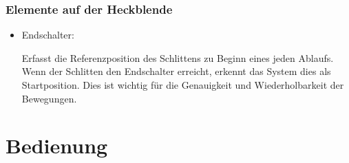 \documentclass[a4paper,12pt]{report}
\begin{document}
	\subsection{Elemente auf der Heckblende}
	\begin{itemize}[leftmargin=1.5em]
		
		\item Endschalter:
		
		Erfasst die Referenzposition des Schlittens zu Beginn eines jeden Ablaufs. Wenn der Schlitten den Endschalter erreicht, erkennt das System dies als Startposition. Dies ist wichtig für die Genauigkeit und Wiederholbarkeit der Bewegungen.\\
		
	\end{itemize}
	
		
	\chapter{Bedienung}
\end{document}
